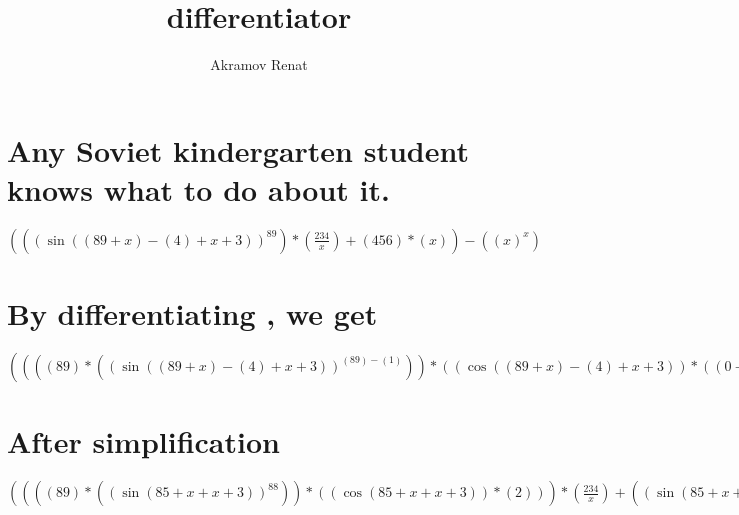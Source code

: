 \documentclass[]{article}
\title{differentiator}
\author{Akramov Renat}
\begin{document}
\maketitle
\section{Any Soviet kindergarten student knows what to do about it.}
$(((\sin((89+x)-(4)+x+3))^{89})*(\frac{234}{x})+(456)*(x))-((x)^{x})$
\section{By differentiating , we get}
$((((89)*((\sin((89+x)-(4)+x+3))^{(89)-(1)}))*((\cos((89+x)-(4)+x+3))*((0+1)-(0)+1+0))+(((\sin((89+x)-(4)+x+3))^{89})*(\ln(\sin((89+x)-(4)+x+3))))*(0))*(\frac{234}{x})+((\sin((89+x)-(4)+x+3))^{89})*(\frac{((0)*(x))-((234)*(1))}{(x)*(x)})+(0)*(x)+(456)*(1))-(((x)*((x)^{(x)-(1)}))*(1)+(((x)^{x})*(\ln(x)))*(1))$
\section{After simplification}
$((((89)*((\sin(85+x+x+3))^{88}))*((\cos(85+x+x+3))*(2)))*(\frac{234}{x})+((\sin(85+x+x+3))^{89})*(\frac{234}{(x)*(x)})+456)-((x)*((x)^{x})+((x)^{x})*(\ln(x)))$
\end{document}
